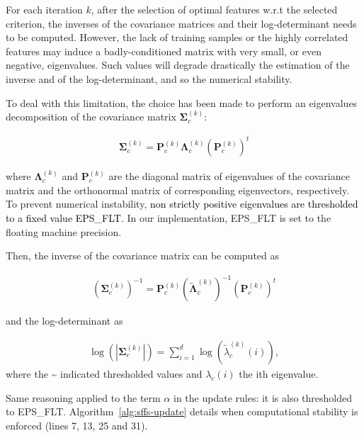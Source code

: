 \documentclass[journal,10pt]{IEEEtran}
\newcommand{\rev}[1]{\textcolor{black}{#1}}
\begin{document}
    For each  iteration $k$, after  the selection of  optimal features
    w.r.t  the  selected criterion,  the  inverses  of the  covariance
    matrices and their log-determinant  needs to be computed. However,
    the lack of training samples or the highly correlated features may
    induce  a  badly-conditioned  matrix  with  very  small,  or  even
    negative, eigenvalues.   Such values will degrade  drastically the
    estimation of the  inverse and of the log-determinant,  and so the
    numerical stability.

    To deal with this limitation, the choice has been made to perform an eigenvalues decomposition of the covariance matrix $\boldsymbol{\Sigma}^{(k)}_c$:

    \begin{eqnarray}
    \boldsymbol{\Sigma}^{(k)}_c = \mathbf{P}^{(k)}_c \boldsymbol{\Lambda}^{(k)}_c (\mathbf{P}^{(k)}_c)^t\label{eq:eigendecomp}
    \end{eqnarray}


    where $\boldsymbol{\Lambda}^{(k)}_c$  and $\mathbf{P}^{(k)}_c$ are
    the diagonal  matrix of eigenvalues  of the covariance  matrix and
    the    orthonormal   matrix    of   corresponding    eigenvectors,
    respectively.  To prevent numerical instability, \rev{non strictly
      positive eigenvalues are thresholded to a fixed value EPS\_FLT}.
    In our  implementation, EPS\_FLT  is set  to the  floating machine
    precision.

    Then, the inverse of the covariance matrix can be computed as

    \begin{eqnarray}
      (\boldsymbol{\Sigma}^{(k)}_c)^{-1} = \mathbf{P}^{(k)}_c (\tilde{\boldsymbol{\Lambda}}^{(k)}_c)^{-1} (\mathbf{P}^{(k)}_c)^t\label{eq:eigendecomp:inv}
    \end{eqnarray}

    and the log-determinant as

    \begin{eqnarray}
      \label{eq:log:det}
      \log \left(|\boldsymbol{\Sigma}_c^{(k)}|\right) = \sum_{i=1}^d\log(\tilde{\lambda}_{c}^{(k)}(i)),
    \end{eqnarray}
    where the \textasciitilde{} indicated thresholded values and $\lambda_{c}(i)$ the ith eigenvalue.

    Same reasoning applied  to the term $\alpha$ in  the update rules:
    it       is       also        thresholded       to       EPS\_FLT.
    Algorithm~\ref{alg:sffs-update}    details   when    computational
    stability is enforced (lines 7, 13, 25 and 31).
\end{document}
